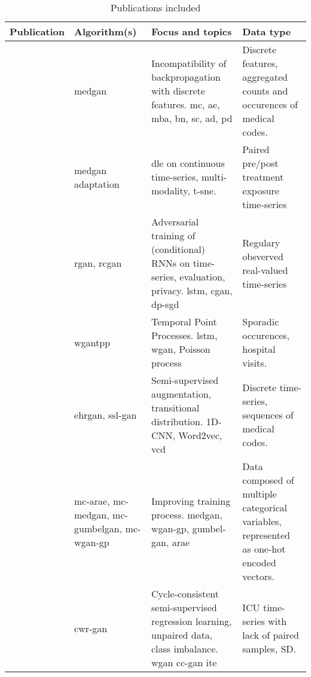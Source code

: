 \begin{sidewaystable}[htbp]
    \scriptsize
    \centering
    \caption{Publications included}\label{tab:publications}
      
        \begin{tabularx}{\textwidth}{@{}p{4cm}XXX@{}} \toprule
            Publication & Algorithm(s) & Focus and topics & Data type \\ \midrule
            
            \cite{Choi2017-nt}
            & \gls{medgan} 
            & Incompatibility of backpropagation with discrete features. \gls{mc}, \gls{ae}, \gls{mba}, \gls{bn}, \gls{sc}, \gls{ad}, \gls{pd}
            & Discrete features, aggregated counts and occurences of medical codes.\\
            
            \cite{yahi2017generative} 
            & \gls{medgan} adaptation
            & \Gls{dle} on continuous time-series, multi-modality, \gls{t-sne}.
            & Paired pre/post treatment exposure time-series\\
            
            \cite{esteban2017real}
            & \gls{rgan}, \gls{rcgan} 
            &  Adversarial training of (conditional) \glspl{RNN} on time-series, evaluation, privacy. \gls{lstm}, \gls{cgan}, \gls{dp-sgd}
            & Regulary obsverved real-valued time-series\\
            
            \cite{Xiao2017-lh} 
            & \gls{wgantpp} 
            & Temporal Point Processes. \gls{lstm}, \gls{wgan}, Poisson process
            & Sporadic occurences, hospital visits.\\
            
            \cite{Che_2017} 
            & \gls{ehrgan}, \gls{ssl-gan} 
            & Semi-supervised augmentation, transitional distribution. 1D-CNN, Word2vec, \gls{vcd}
            & Discrete time-series, sequences of medical codes. \\
            
            \cite{Camino2018-re} 
            &\gls{mc-arae}, \gls{mc-medgan}, \gls{mc-gumbelgan}, \gls{mc-wgan-gp} 
            & Improving training process. \gls{medgan}, \gls{wgan-gp}, \gls{gumbel-gan}, \gls{arae}
            & Data composed of multiple categorical variables, represented as one-hot encoded vectors. \\
            
            \cite{mcdermott2018semi}
            & \gls{cwr-gan}
            & Cycle-consistent semi-supervised regression learning, unpaired data, class imbalance. \gls{wgan} \gls{cc-gan} \gls{ite}
            & ICU time-series with lack of paired samples, \gls{SD}. \\
            

\end{tabularx}
\end{sidewaystable}
